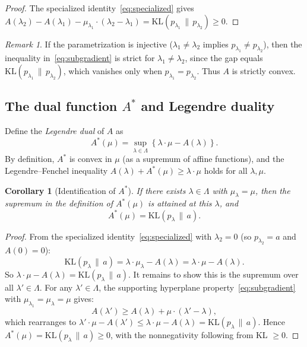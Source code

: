 \documentclass[11pt, a4paper, 
onecolumn, 
showabstract]{naverlabseurope-onecol-flex}
\newtheorem{corollary}[theorem]{Corollary}
\theoremstyle{definition}
\theoremstyle{remark}
\newtheorem{remark}[theorem]{Remark}
\newcommand{\KL}[2]{\mathrm{KL}\!\left(#1 \,\|\, #2\right)}
\begin{document}
\begin{proof}
The specialized identity~\eqref{eq:specialized} gives
$A(\lambda_2) - A(\lambda_1) - \mu_{\lambda_1}\cdot(\lambda_2 - \lambda_1) = \KL{p_{\lambda_1}}{p_{\lambda_2}} \geq 0$.
\end{proof}

\begin{remark}\label{rem:strict}
If the parametrization is injective ($\lambda_1 \neq \lambda_2$ implies $p_{\lambda_1} \neq p_{\lambda_2}$), then the inequality in~\eqref{eq:subgradient} is strict for $\lambda_1 \neq \lambda_2$, since the gap equals $\KL{p_{\lambda_1}}{p_{\lambda_2}}$, which vanishes only when $p_{\lambda_1} = p_{\lambda_2}$.
Thus $A$ is strictly convex.
\end{remark}



\subsection{The dual function $A^*$ and Legendre duality}\label{sec:dual}

Define the \emph{Legendre dual} of $A$ as
\[
    A^*(\mu) = \sup_{\lambda \in \Lambda} \left\{ \lambda \cdot \mu - A(\lambda) \right\}.
\]
By definition, $A^*$ is convex in $\mu$ (as a supremum of affine functions), and the Legendre--Fenchel inequality $A(\lambda) + A^*(\mu) \geq \lambda \cdot \mu$ holds for all $\lambda, \mu$.

\begin{corollary}[Identification of $A^*$]\label{cor:dual}
If there exists $\lambda \in \Lambda$ with $\mu_\lambda = \mu$, then the supremum in the definition of $A^*(\mu)$ is attained at this $\lambda$, and
\begin{equation}\label{eq:dual}
    A^*(\mu) = \KL{p_\lambda}{a}.
\end{equation}
\end{corollary}

\begin{proof}
From the specialized identity~\eqref{eq:specialized} with $\lambda_2 = 0$ (so $p_{\lambda_2} = a$ and $A(0) = 0$):
\[
    \KL{p_\lambda}{a} = \lambda \cdot \mu_\lambda - A(\lambda) = \lambda \cdot \mu - A(\lambda).
\]
So $\lambda \cdot \mu - A(\lambda) = \KL{p_\lambda}{a}$.
It remains to show this is the supremum over all $\lambda' \in \Lambda$.
For any $\lambda' \in \Lambda$, the supporting hyperplane property~\eqref{eq:subgradient} with $\mu_{\lambda_1} = \mu_\lambda = \mu$ gives:
\[
    A(\lambda') \geq A(\lambda) + \mu \cdot (\lambda' - \lambda),
\]
which rearranges to $\lambda' \cdot \mu - A(\lambda') \leq \lambda \cdot \mu - A(\lambda) = \KL{p_\lambda}{a}$.
Hence $A^*(\mu) = \KL{p_\lambda}{a} \geq 0$, with the nonnegativity following from KL $\geq 0$.
\end{proof}
\end{document}
